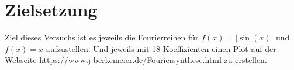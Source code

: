 \section{Zielsetzung}

Ziel dieses Versuchs ist es jeweils die Fourierreihen für $f(x)=|\sin(x)|$ und $f(x)=x$ aufzustellen. 
Und jeweils mit 18 Koeffizienten einen Plot auf der Webseite https://www.j-berkemeier.de/Fouriersynthese.html zu erstellen.